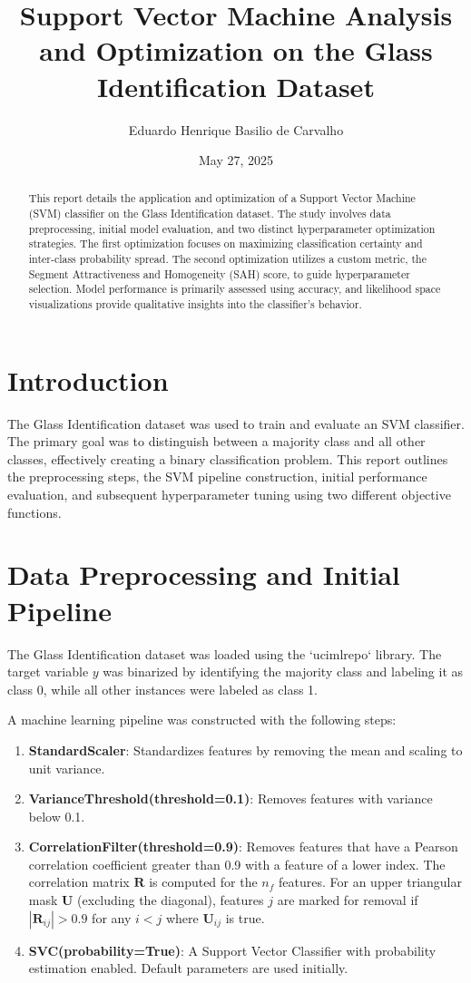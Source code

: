 \documentclass{article}
\title{Support Vector Machine Analysis and Optimization on the Glass Identification Dataset}
\author{Eduardo Henrique Basilio de Carvalho}
\date{May 27, 2025}
\begin{document}
\maketitle

\begin{abstract}
This report details the application and optimization of a Support Vector Machine (SVM) classifier on the Glass Identification dataset. The study involves data preprocessing, initial model evaluation, and two distinct hyperparameter optimization strategies. The first optimization focuses on maximizing classification certainty and inter-class probability spread. The second optimization utilizes a custom metric, the Segment Attractiveness and Homogeneity (SAH) score, to guide hyperparameter selection. Model performance is primarily assessed using accuracy, and likelihood space visualizations provide qualitative insights into the classifier's behavior.
\end{abstract}

\section{Introduction}
The Glass Identification dataset was used to train and evaluate an SVM classifier. The primary goal was to distinguish between a majority class and all other classes, effectively creating a binary classification problem. This report outlines the preprocessing steps, the SVM pipeline construction, initial performance evaluation, and subsequent hyperparameter tuning using two different objective functions.

\section{Data Preprocessing and Initial Pipeline}
The Glass Identification dataset was loaded using the `ucimlrepo` library. The target variable $y$ was binarized by identifying the majority class and labeling it as class 0, while all other instances were labeled as class 1.

A machine learning pipeline was constructed with the following steps:
\begin{enumerate}
    \item \textbf{StandardScaler}: Standardizes features by removing the mean and scaling to unit variance.
    \item \textbf{VarianceThreshold(threshold=0.1)}: Removes features with variance below 0.1.
    \item \textbf{CorrelationFilter(threshold=0.9)}: Removes features that have a Pearson correlation coefficient greater than 0.9 with a feature of a lower index. The correlation matrix $\mathbf{R}$ is computed for the $n_f$ features. For an upper triangular mask $\mathbf{U}$ (excluding the diagonal), features $j$ are marked for removal if $|\mathbf{R}_{ij}| > 0.9$ for any $i < j$ where $\mathbf{U}_{ij}$ is true.
    \item \textbf{SVC(probability=True)}: A Support Vector Classifier with probability estimation enabled. Default parameters are used initially.
\end{enumerate}
\end{document}
